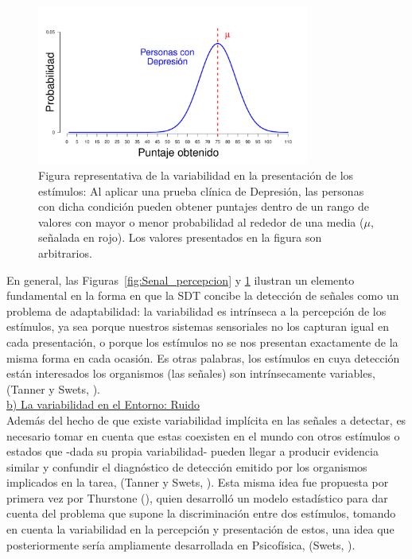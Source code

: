 \begin{figure}[th]
\centering
\includegraphics[width=0.80\textwidth]{Figures/Signal_Presentation} 
\caption[Variabilidad en la presentación de los estímulos]{Figura representativa de la variabilidad en la presentación de los estímulos: Al aplicar una prueba clínica de Depresión, las personas con dicha condición pueden obtener puntajes dentro de un rango de valores con mayor o menor probabilidad al rededor de una media ($\mu$, señalada en rojo). Los valores presentados en la figura son arbitrarios.}
\label{fig:Senal_presentacion}
\end{figure}


En general, las Figuras~\ref{fig:Senal_percepcion} y \ref{fig:Senal_presentacion} ilustran un elemento fundamental en la forma en que la SDT concibe la detección de señales como un problema de adaptabilidad: la variabilidad es intrínseca a la percepción de los estímulos, ya sea porque nuestros sistemas sensoriales no los capturan igual en cada presentación, o porque los estímulos no se nos presentan exactamente de la misma forma en cada ocasión. Es otras palabras, los estímulos en cuya detección están interesados los organismos (las señales) son intrínsecamente variables, (Tanner y Swets, \citeyear{Tanner1954}).\\

    \underline{b) La variabilidad en el Entorno: Ruido}\\

Además del hecho de que existe variabilidad implícita en las señales a detectar, es necesario tomar en cuenta que estas coexisten en el mundo con otros estímulos o estados que -dada su propia variabilidad- pueden llegar a producir evidencia similar y confundir el diagnóstico de detección emitido por los organismos implicados en la tarea, (Tanner y Swets, \citeyear{Tanner1954}). Esta misma idea fue propuesta por primera vez por Thurstone (\citeyear{Thurstone1927}), quien desarrolló un modelo estadístico para dar cuenta del problema que supone la discriminación entre dos estímulos, tomando en cuenta la variabilidad en la percepción y presentación de estos, una idea que posteriormente sería ampliamente desarrollada en Psicofísica, (Swets, \citeyear{Swets1973}).\\

